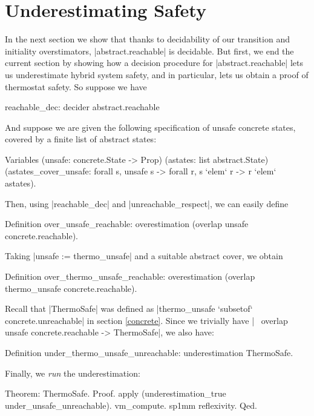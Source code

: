 \documentclass[runningheads]{llncs}
\begin{document}

\section{Underestimating Safety}
\label{underestimatingsafety}

In the next section we show that thanks to decidability of our transition and initiality overstimators, |abstract.reachable| is decidable. But first, we end the current section by showing how a decision procedure for |abstract.reachable| lets us underestimate hybrid system safety, and in particular, lets us obtain a proof of thermostat safety. So suppose we have
\begin{code}
  reachable_dec: decider abstract.reachable
\end{code}
And suppose we are given the following specification of unsafe concrete states, covered by a finite list of abstract states:
\begin{code}
  Variables
    (unsafe: concrete.State -> Prop)
    (astates: list abstract.State)
    (astates_cover_unsafe: forall s, unsafe s -> forall r, s `elem` r -> r `elem` astates).
\end{code}
Then, using |reachable_dec| and |unreachable_respect|, we can easily define
\begin{code}
  Definition over_unsafe_reachable: overestimation (overlap unsafe concrete.reachable).
\end{code}
Taking |unsafe := thermo_unsafe| and a suitable abstract cover, we obtain
\begin{code}
  Definition over_thermo_unsafe_reachable:
    overestimation (overlap thermo_unsafe concrete.reachable).
\end{code}
Recall that |ThermoSafe| was defined as |thermo_unsafe `subsetof` concrete.unreachable| in section \ref{concrete}. Since we trivially have |~ overlap unsafe concrete.reachable -> ThermoSafe|, we also have:
\begin{code}
Definition under_thermo_unsafe_unreachable: underestimation ThermoSafe.
\end{code}
Finally, we \emph{run} the underestimation:
\begin{code}
Theorem: ThermoSafe.
Proof.
  apply (underestimation_true under_unsafe_unreachable).
  vm_compute. sp1mm reflexivity.
Qed.
\end{code}
\end{document}
